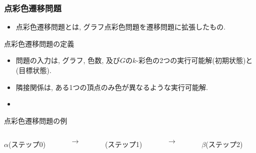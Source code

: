 \documentclass[dvipdfmx,11pt]{beamer}
\begin{document}
\begin{frame}\frametitle{点彩色遷移問題}
  \begin{itemize}
    \item \alert{点彩色遷移問題}とは, グラフ点彩色問題を遷移問題に拡張したもの.
  \end{itemize}

  \begin{block}{点彩色遷移問題の定義}
    \begin{itemize}
      \item 問題の入力は, グラフ, 色数, 及び$G$の$k$-彩色の2つの実行可能解\structure{$\alpha$}(初期状態)と\structure{$\beta$}(目標状態).
      \item 隣接関係は, ある1つの頂点のみ色が異なるような実行可能解.
      \item {}
    \end{itemize}
  \end{block}

  \begin{exampleblock}{点彩色遷移問題の例}
    \begin{columns}
      \begin{column}{0.3\textwidth}
        \centering
        
        $\alpha$(ステップ0)
      \end{column}
      \begin{column}{0.05\textwidth}
        \textbf{$\longrightarrow$}
      \end{column}
      \begin{column}[]{0.3\textwidth}
        \centering
        
        (ステップ1)
      \end{column}
      \begin{column}{0.05\textwidth}
        \textbf{$\longrightarrow$}
      \end{column}
      \begin{column}{0.3\textwidth}
        \centering
        
        $\beta$(ステップ2)
      \end{column}
    \end{columns}
  \end{exampleblock}
  
\end{frame}

\end{document}
